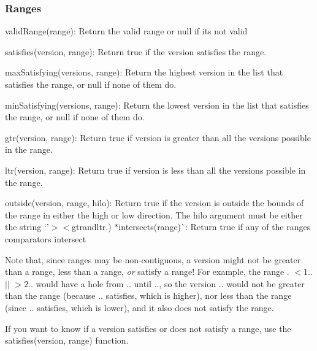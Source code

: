 \subsubsection*{Ranges}


\begin{DoxyItemize}
\item {\ttfamily valid\+Range(range)}\+: Return the valid range or null if it\textquotesingle{}s not valid
\item {\ttfamily satisfies(version, range)}\+: Return true if the version satisfies the range.
\item {\ttfamily max\+Satisfying(versions, range)}\+: Return the highest version in the list that satisfies the range, or {\ttfamily null} if none of them do.
\item {\ttfamily min\+Satisfying(versions, range)}\+: Return the lowest version in the list that satisfies the range, or {\ttfamily null} if none of them do.
\item {\ttfamily gtr(version, range)}\+: Return {\ttfamily true} if version is greater than all the versions possible in the range.
\item {\ttfamily ltr(version, range)}\+: Return {\ttfamily true} if version is less than all the versions possible in the range.
\item {\ttfamily outside(version, range, hilo)}\+: Return true if the version is outside the bounds of the range in either the high or low direction. The {\ttfamily hilo} argument must be either the string `'$>$\textquotesingle{}$<$gtr{\ttfamily and}ltr{\ttfamily .) $\ast$}intersects(range)\`{}\+: Return true if any of the ranges comparators intersect
\end{DoxyItemize}

Note that, since ranges may be non-\/contiguous, a version might not be greater than a range, less than a range, {\itshape or} satisfy a range! For example, the range {. $<$1.. $\vert$$\vert$ $>$2..} would have a hole from {..} until {..}, so the version {..} would not be greater than the range (because {..} satisfies, which is higher), nor less than the range (since {..} satisfies, which is lower), and it also does not satisfy the range.

If you want to know if a version satisfies or does not satisfy a range, use the {\ttfamily satisfies(version, range)} function.

